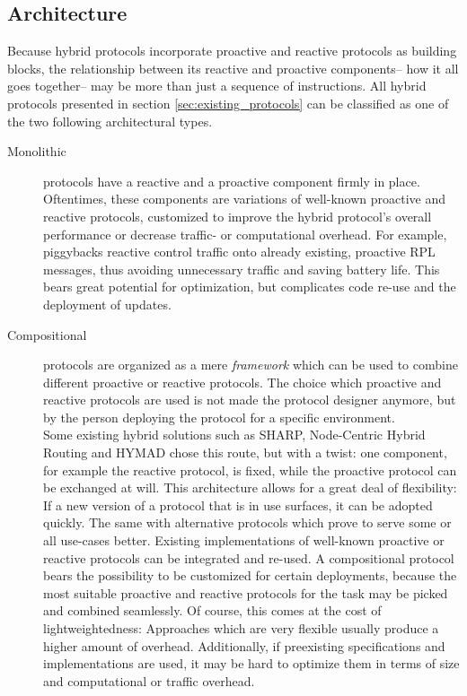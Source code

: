 \documentclass[a4paper,10pt]{scrartcl}
\begin{document}
\subsection{Architecture}
\label{subsec:architecture}
Because hybrid protocols incorporate proactive and reactive protocols as building blocks, the relationship between its reactive and proactive components-- how it all goes together-- may be more than just a sequence of instructions. All hybrid protocols presented in section \ref{sec:existing_protocols} can be classified as one of the two following architectural types.
\begin{description}
\item[Monolithic] protocols have a reactive and a proactive component firmly in place. Oftentimes, these components are variations of well-known proactive and reactive protocols, customized to improve the hybrid protocol's overall performance or decrease traffic- or computational overhead. For example, \cite{baccelli_p2p_rpl} piggybacks reactive control traffic onto already existing, proactive RPL messages, thus avoiding unnecessary traffic and saving battery life. %
This bears great potential for optimization, but complicates code re-use and the deployment of updates.\\
\item[Compositional] protocols are organized as a mere \emph{framework} which can be used to combine different proactive or reactive protocols. 
The choice which proactive and reactive protocols are used is not made the protocol designer anymore, but by the person deploying the protocol for a specific environment.\\
Some existing hybrid solutions such as SHARP, Node-Centric Hybrid Routing and HYMAD chose this route, but with a twist: one component, for example the reactive protocol, is fixed, while the proactive protocol can be exchanged at will. This architecture allows for a great deal of flexibility: If a new version of a protocol that is in use surfaces, it can be adopted quickly. The same with alternative protocols which prove to serve some or all use-cases better. Existing implementations of well-known proactive or reactive protocols can be integrated and re-used.
A compositional protocol bears the possibility to be customized for certain deployments, because the most suitable proactive and reactive protocols for the task may be picked and combined seamlessly.
Of course, this comes at the cost of lightweightedness: Approaches which are very flexible usually produce a higher amount of overhead. Additionally, if preexisting specifications and implementations are used, it may be hard to optimize them in terms of size and computational or traffic overhead.
\end{description}
\end{document}
